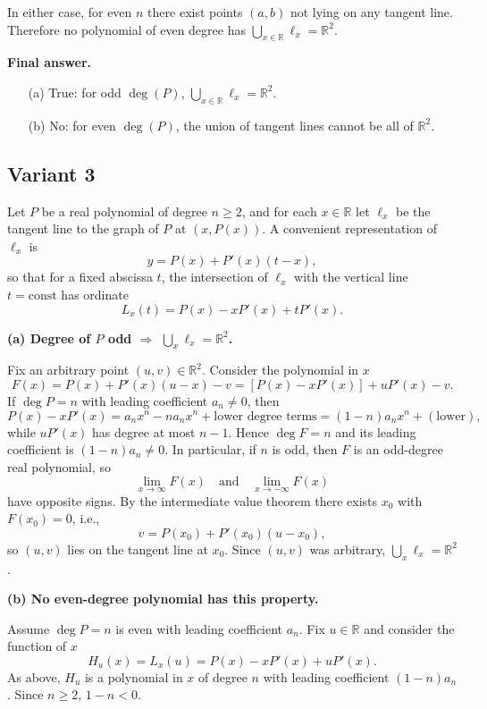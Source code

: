 \documentclass[12pt,a4paper]{article}
\theoremstyle{definition}
\begin{document}
    In either case, for even $n$ there exist points $(a, b)$ not lying on any tangent line. Therefore no polynomial of even degree has $\bigcup_{x\in\mathbb{R}} \ell_x = \mathbb{R}^2$.

    \textbf{Final answer.}
    \begin{enumerate}
        \item[(a)] True: for odd $\deg(P)$, $\bigcup_{x\in\mathbb{R}} \ell_x = \mathbb{R}^2$.
        \item[(b)] No: for even $\deg(P)$, the union of tangent lines cannot be all of $\mathbb{R}^2$.
    \end{enumerate}

    \subsection{Variant 3}
    Let $P$ be a real polynomial of degree $n \geq 2$, and for each $x \in \mathbb{R}$ let $\ell_x$ be the tangent line to the graph of $P$ at $(x, P(x))$. A convenient representation of $\ell_x$ is
    $$y = P(x) + P'(x)(t - x),$$
    so that for a fixed abscissa $t$, the intersection of $\ell_x$ with the vertical line $t = \text{const}$ has ordinate
    $$L_x(t) = P(x) - xP'(x) + tP'(x).$$

    \textbf{(a) Degree of $P$ odd $\Rightarrow$ $\bigcup_x \ell_x = \mathbb{R}^2$.}

    Fix an arbitrary point $(u, v) \in \mathbb{R}^2$. Consider the polynomial in $x$
    $$F(x) = P(x) + P'(x)(u - x) - v = [P(x) - xP'(x)] + uP'(x) - v.$$
    If $\deg P = n$ with leading coefficient $a_n \neq 0$, then
    $$P(x) - xP'(x) = a_n x^n - n a_n x^n + \text{lower degree terms} = (1 - n) a_n x^n + (\text{lower}),$$
    while $uP'(x)$ has degree at most $n - 1$. Hence $\deg F = n$ and its leading coefficient is $(1 - n) a_n \neq 0$. In particular, if $n$ is odd, then $F$ is an odd-degree real polynomial, so
    $$\lim_{x \to \infty} F(x) \quad \text{and} \quad \lim_{x \to -\infty} F(x)$$
    have opposite signs. By the intermediate value theorem there exists $x_0$ with $F(x_0) = 0$, i.e.,
    $$v = P(x_0) + P'(x_0)(u - x_0),$$
    so $(u, v)$ lies on the tangent line at $x_0$. Since $(u, v)$ was arbitrary, $\bigcup_x \ell_x = \mathbb{R}^2$.

    \textbf{(b) No even-degree polynomial has this property.}

    Assume $\deg P = n$ is even with leading coefficient $a_n$. Fix $u \in \mathbb{R}$ and consider the function of $x$
    $$H_u(x) = L_x(u) = P(x) - xP'(x) + uP'(x).$$
    As above, $H_u$ is a polynomial in $x$ of degree $n$ with leading coefficient $(1 - n) a_n$. Since $n \geq 2$, $1 - n < 0$.
\end{document}
